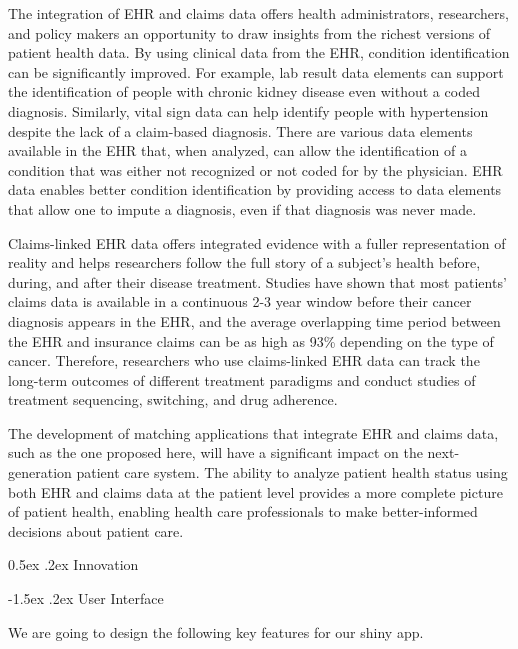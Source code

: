 \documentclass[11pt,]{article}
\makeatletter
\renewcommand\subsection{
  \@startsection{subsection}{2}{\z@}
    {-1.5ex\@plus -1ex \@minus -.2ex}%
    {0.5ex \@plus .2ex}%
    {\normalfont\normalsize\bf}} %
\renewcommand\paragraph{
  \@startsection{paragraph}{4}{\z@}
    {-0.5ex\@plus -1ex \@minus -.2ex}%
    {-1.5ex \@plus .2ex}%
    {\normalfont\normalsize\bf}} %
\makeatother
\begin{document}
The integration of EHR and claims data offers health administrators,
researchers, and policy makers an opportunity to draw insights from the
richest versions of patient health data. By using clinical data from the
EHR, condition identification can be significantly improved. For
example, lab result data elements can support the identification of
people with chronic kidney disease even without a coded diagnosis.
Similarly, vital sign data can help identify people with hypertension
despite the lack of a claim-based diagnosis. There are various data
elements available in the EHR that, when analyzed, can allow the
identification of a condition that was either not recognized or not
coded for by the physician. EHR data enables better condition
identification by providing access to data elements that allow one to
impute a diagnosis, even if that diagnosis was never made.

Claims-linked EHR data offers integrated evidence with a fuller
representation of reality and helps researchers follow the full story of
a subject's health before, during, and after their disease treatment.
Studies have shown that most patients' claims data is available in a
continuous 2-3 year window before their cancer diagnosis appears in the
EHR, and the average overlapping time period between the EHR and
insurance claims can be as high as 93\% depending on the type of cancer.
Therefore, researchers who use claims-linked EHR data can track the
long-term outcomes of different treatment paradigms and conduct studies
of treatment sequencing, switching, and drug adherence.

The development of matching applications that integrate EHR and claims
data, such as the one proposed here, will have a significant impact on
the next-generation patient care system. The ability to analyze patient
health status using both EHR and claims data at the patient level
provides a more complete picture of patient health, enabling health care
professionals to make better-informed decisions about patient care.

\subsection{Innovation}\label{innovation}

\paragraph{User Interface}\label{user-interface}

We are going to design the following key features for our shiny app.
\end{document}
